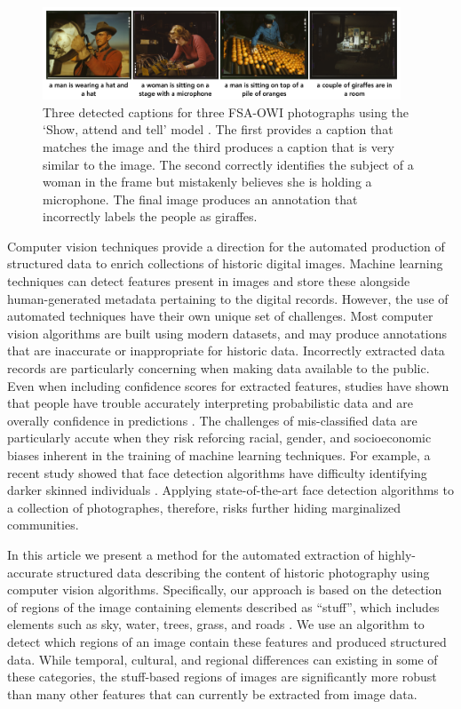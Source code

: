 \documentclass[10pt, a4paper]{article}
\begin{document}
\begin{figure}[!ht]
\begin{center}
\includegraphics[width=0.95\textwidth]{../figures/captions.png}
\caption{Three detected captions for three FSA-OWI photographs using the
`Show, attend and tell' model \protect\cite{xu2015show}. The first provides a
caption that matches the image and the third produces a caption that is very
similar to the image. The second correctly identifies the subject of a woman
in the frame but mistakenly believes she is holding a microphone. The final
image produces an annotation that incorrectly labels the people as giraffes.}
\label{fig:captions}
\end{center}
\end{figure}

Computer vision techniques provide a direction for the automated production of
structured data to enrich collections of historic digital images. Machine
learning techniques can detect features present in images and store these
alongside human-generated metadata pertaining to the digital records. However,
the use of automated techniques have their own unique set of challenges. Most
computer vision algorithms are built using modern datasets, and may produce
annotations that are inaccurate or inappropriate for historic data. Incorrectly
extracted data records are particularly concerning when making data available
to the public. Even when including confidence scores for extracted features,
studies have shown that people have trouble accurately interpreting probabilistic
data and are overally confidence in predictions \cite{khaw2019individual}.
The challenges of mis-classified data are particularly accute when they risk
reforcing racial, gender, and socioeconomic biases inherent in the training of
machine learning techniques. For example, a recent study showed that face
detection algorithms have difficulty identifying darker skinned individuals
\cite{buolamwini2018gender}. Applying state-of-the-art face detection
algorithms to a collection of photographes, therefore, risks further hiding
marginalized communities.

In this article we present a method for the automated extraction of
highly-accurate structured data describing the content of historic photography
using computer vision algorithms. Specifically, our approach is based on the
detection of regions of the image containing elements described as ``stuff'',
which includes elements such as sky, water, trees, grass, and roads
\cite{caesar2018coco}. We use an algorithm to detect which regions of an image
contain these features and produced structured data. While temporal, cultural,
and regional differences can existing in some of these categories, the
stuff-based regions of images are significantly more robust than many other
features that can currently be extracted from image data.
\end{document}
